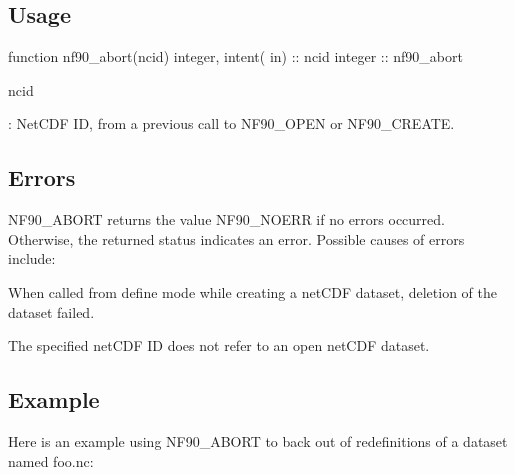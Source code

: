 \subsection*{Usage}


\begin{DoxyCode}
\textcolor{keyword}{function }nf90\_abort(ncid)
  \textcolor{keywordtype}{integer}, \textcolor{keywordtype}{intent( in)} :: ncid
  \textcolor{keywordtype}{integer}              :: nf90\_abort
\end{DoxyCode}


{\ttfamily ncid}

\+: Net\+C\+DF ID, from a previous call to N\+F90\+\_\+\+O\+P\+EN or N\+F90\+\_\+\+C\+R\+E\+A\+TE.

\subsection*{Errors}

N\+F90\+\_\+\+A\+B\+O\+RT returns the value N\+F90\+\_\+\+N\+O\+E\+RR if no errors occurred. Otherwise, the returned status indicates an error. Possible causes of errors include\+:


\begin{DoxyItemize}
\item When called from define mode while creating a net\+C\+DF dataset, deletion of the dataset failed.
\item The specified net\+C\+DF ID does not refer to an open net\+C\+DF dataset.
\end{DoxyItemize}

\subsection*{Example}

Here is an example using N\+F90\+\_\+\+A\+B\+O\+RT to back out of redefinitions of a dataset named foo.\+nc\+:


